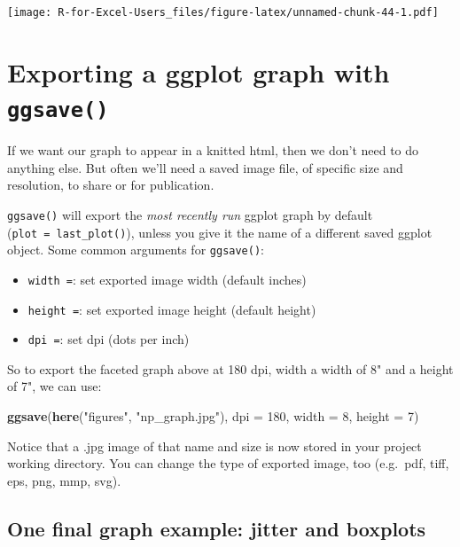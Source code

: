\documentclass[]{book}
\newenvironment{Shaded}{\begin{snugshade}}{\end{snugshade}}
\newcommand{\DataTypeTok}[1]{\textcolor[rgb]{0.13,0.29,0.53}{#1}}
\newcommand{\DecValTok}[1]{\textcolor[rgb]{0.00,0.00,0.81}{#1}}
\newcommand{\KeywordTok}[1]{\textcolor[rgb]{0.13,0.29,0.53}{\textbf{#1}}}
\newcommand{\NormalTok}[1]{#1}
\newcommand{\StringTok}[1]{\textcolor[rgb]{0.31,0.60,0.02}{#1}}
\providecommand{\tightlist}{%
  \setlength{\itemsep}{0pt}\setlength{\parskip}{0pt}}
\begin{document}
\texttt{[image: R-for-Excel-Users\_files/figure-latex/unnamed-chunk-44-1.pdf]}

\hypertarget{exporting-a-ggplot-graph-with-ggsave}{%
\section{\texorpdfstring{Exporting a ggplot graph with \texttt{ggsave()}}{Exporting a ggplot graph with ggsave()}}\label{exporting-a-ggplot-graph-with-ggsave}}

If we want our graph to appear in a knitted html, then we don't need to do anything else. But often we'll need a saved image file, of specific size and resolution, to share or for publication.

\texttt{ggsave()} will export the \emph{most recently run} ggplot graph by default (\texttt{plot\ =\ last\_plot()}), unless you give it the name of a different saved ggplot object. Some common arguments for \texttt{ggsave()}:

\begin{itemize}
\tightlist
\item
  \texttt{width\ =}: set exported image width (default inches)
\item
  \texttt{height\ =}: set exported image height (default height)
\item
  \texttt{dpi\ =}: set dpi (dots per inch)
\end{itemize}

So to export the faceted graph above at 180 dpi, width a width of 8" and a height of 7", we can use:

\begin{Shaded}
\begin{Highlighting}[]
\KeywordTok{ggsave}\NormalTok{(}\KeywordTok{here}\NormalTok{(}\StringTok{"figures"}\NormalTok{, }\StringTok{"np_graph.jpg"}\NormalTok{), }\DataTypeTok{dpi =} \DecValTok{180}\NormalTok{, }\DataTypeTok{width =} \DecValTok{8}\NormalTok{, }\DataTypeTok{height =} \DecValTok{7}\NormalTok{)}
\end{Highlighting}
\end{Shaded}

Notice that a .jpg image of that name and size is now stored in your project working directory. You can change the type of exported image, too (e.g.~pdf, tiff, eps, png, mmp, svg).

\hypertarget{one-final-graph-example-jitter-and-boxplots}{%
\subsection{One final graph example: jitter and boxplots}\label{one-final-graph-example-jitter-and-boxplots}}
\end{document}
